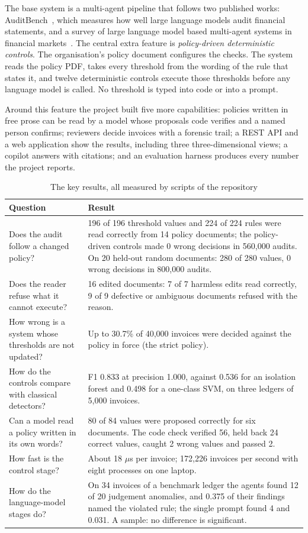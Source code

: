 \documentclass[11pt,a4paper]{article}
\begin{document}
The base system is a multi-agent pipeline that follows two published works: AuditBench~\cite{wang2025auditbench}, which measures how well large language models audit financial statements, and a survey of large language model based multi-agent systems in financial markets~\cite{liu2026survey}. The central extra feature is \emph{policy-driven deterministic controls}. The organisation's policy document configures the checks. The system reads the policy PDF, takes every threshold from the wording of the rule that states it, and twelve deterministic controls execute those thresholds before any language model is called. No threshold is typed into code or into a prompt.

Around this feature the project built five more capabilities: policies written in free prose can be read by a model whose proposals code verifies and a named person confirms; reviewers decide invoices with a forensic trail; a REST API and a web application show the results, including three three-dimensional views; a copilot answers with citations; and an evaluation harness produces every number the project reports.

\begin{table}[htbp]
\caption{The key results, all measured by scripts of the repository}
\label{tab:key}
\centering
\small
\begin{tabular}{L{5.2cm}L{10.5cm}}
\toprule
Question & Result \\
\midrule
Does the audit follow a changed policy? & 196 of 196 threshold values and 224 of 224 rules were read correctly from 14 policy documents; the policy-driven controls made 0 wrong decisions in 560,000 audits. On 20 held-out random documents: 280 of 280 values, 0 wrong decisions in 800,000 audits. \\
Does the reader refuse what it cannot execute? & 16 edited documents: 7 of 7 harmless edits read correctly, 9 of 9 defective or ambiguous documents refused with the reason. \\
How wrong is a system whose thresholds are not updated? & Up to 30.7\% of 40,000 invoices were decided against the policy in force (the strict policy). \\
How do the controls compare with classical detectors? & F1 0.833 at precision 1.000, against 0.536 for an isolation forest and 0.498 for a one-class SVM, on three ledgers of 5,000 invoices. \\
Can a model read a policy written in its own words? & 80 of 84 values were proposed correctly for six documents. The code check verified 56, held back 24 correct values, caught 2 wrong values and passed 2. \\
How fast is the control stage? & About 18 $\mu$s per invoice; 172,226 invoices per second with eight processes on one laptop. \\
How do the language-model stages do? & On 34 invoices of a benchmark ledger the agents found 12 of 20 judgement anomalies, and 0.375 of their findings named the violated rule; the single prompt found 4 and 0.031. A sample: no difference is significant. \\
\bottomrule
\end{tabular}
\end{table}
\end{document}
